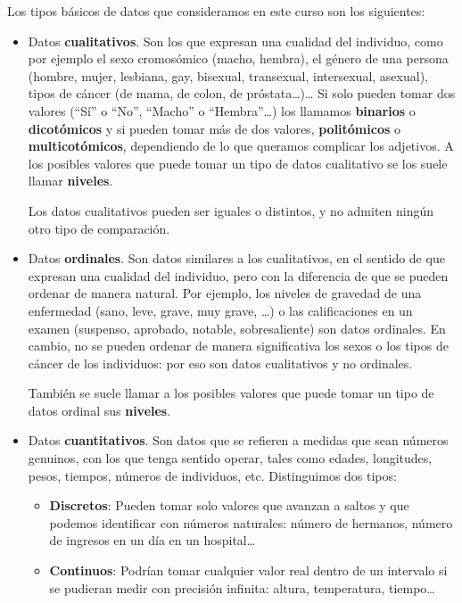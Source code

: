 \documentclass[
  spanish,
  letterpaper,
  DIV=11,
  numbers=noendperiod]{scrreprt}
\begin{document}
Los tipos básicos de datos que consideramos en este curso son los
siguientes:

\begin{itemize}
\item
  Datos \textbf{cualitativos}. Son los que expresan una cualidad del
  individuo, como por ejemplo el sexo cromosómico (macho, hembra), el
  género de una persona (hombre, mujer, lesbiana, gay, bisexual,
  transexual, intersexual, asexual), tipos de cáncer (de mama, de colon,
  de próstata\ldots)\ldots{} Si solo pueden tomar dos valores (``Sí'' o
  ``No'', ``Macho'' o ``Hembra''\ldots) los llamamos \textbf{binarios} o
  \textbf{dicotómicos} y si pueden tomar más de dos valores,
  \textbf{politómicos} o \textbf{multicotómicos}, dependiendo de lo que
  queramos complicar los adjetivos. A los posibles valores que puede
  tomar un tipo de datos cualitativo se los suele llamar
  \textbf{niveles}.

  Los datos cualitativos pueden ser iguales o distintos, y no admiten
  ningún otro tipo de comparación.
\item
  Datos \textbf{ordinales}. Son datos similares a los cualitativos, en
  el sentido de que expresan una cualidad del individuo, pero con la
  diferencia de que se pueden ordenar de manera natural. Por ejemplo,
  los niveles de gravedad de una enfermedad (sano, leve, grave, muy
  grave, \ldots) o las calificaciones en un examen (suspenso, aprobado,
  notable, sobresaliente) son datos ordinales. En cambio, no se pueden
  ordenar de manera significativa los sexos o los tipos de cáncer de los
  individuos: por eso son datos cualitativos y no ordinales.

  También se suele llamar a los posibles valores que puede tomar un tipo
  de datos ordinal sus \textbf{niveles}.
\item
  Datos \textbf{cuantitativos}. Son datos que se refieren a medidas que
  sean números genuinos, con los que tenga sentido operar, tales como
  edades, longitudes, pesos, tiempos, números de individuos, etc.
  Distinguimos dos tipos:

  \begin{itemize}
  \item
    \textbf{Discretos}: Pueden tomar solo valores que avanzan a saltos y
    que podemos identificar con números naturales: número de hermanos,
    número de ingresos en un día en un hospital\ldots{}
  \item
    \textbf{Continuos}: Podrían tomar cualquier valor real dentro de un
    intervalo si se pudieran medir con precisión infinita: altura,
    temperatura, tiempo\ldots{}
  \end{itemize}
\end{itemize}
\end{document}
